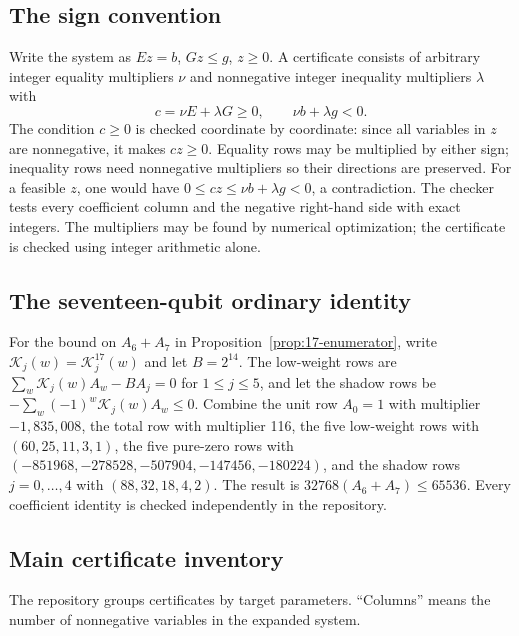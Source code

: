\subsection{The sign convention}

Write the system as \(Ez=b\), \(Gz\leq g\), \(z\geq0\).
A certificate consists of arbitrary integer equality multipliers \(\nu\)
and nonnegative integer inequality multipliers \(\lambda\) with
\[
 c=\nu E+\lambda G\geq0,\qquad \nu b+\lambda g<0.
\]
The condition \(c\geq0\) is checked coordinate by coordinate: since
all variables in \(z\) are nonnegative, it makes \(cz\geq0\).
Equality rows may be multiplied by either sign; inequality rows need
nonnegative multipliers so their directions are preserved.
For a feasible \(z\), one would have
\(0\leq cz\leq\nu b+\lambda g<0\), a contradiction.
The checker tests every coefficient column and the negative right-hand side
with exact integers. The multipliers may be found by numerical optimization; the certificate
is checked using integer arithmetic alone.

\subsection{The seventeen-qubit ordinary identity}\label{app:ordinary17}

For the bound on \(A_6+A_7\) in Proposition~\ref{prop:17-enumerator},
write \(\mathcal{K}_j(w)=\mathcal{K}_j^{17}(w)\) and let \(B=2^{14}\). The low-weight rows are
\(\sum_w \mathcal{K}_j(w)A_w-BA_j=0\) for \(1\leq j\leq5\), and let the
shadow rows be \(-\sum_w(-1)^w\mathcal{K}_j(w)A_w\leq0\).
Combine the unit row \(A_0=1\) with multiplier \(-1,835,008\),
the total row with multiplier 116, the five low-weight rows with
\((60,25,11,3,1)\), the five pure-zero rows with
\((-851968,-278528,-507904,-147456,-180224)\), and the shadow rows
\(j=0,\ldots,4\) with \((88,32,18,4,2)\).
The result is
\(32768(A_6+A_7)\leq65536\).
Every coefficient identity is checked independently in the repository.

\subsection{Main certificate inventory}

The repository groups certificates by target parameters. ``Columns'' means
the number of nonnegative variables in the expanded system.

